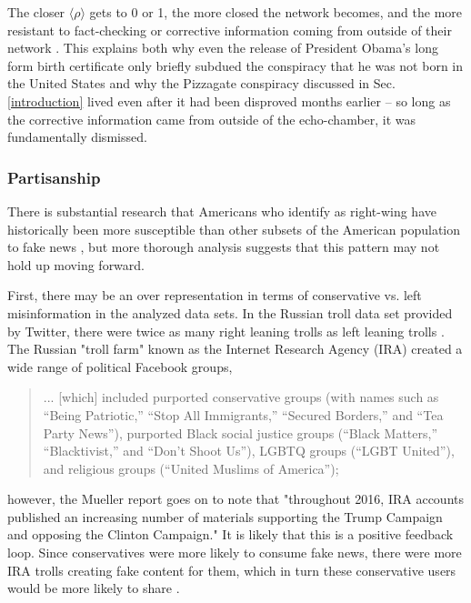 \documentclass[preprint,review,12pt]{elsarticle}
\begin{document}
The closer $\langle \rho \rangle$ gets to 0 or 1, the more closed the network becomes, and the more resistant to fact-checking or corrective information coming from outside of their network \cite{garrett2013undermining,lord1979biased,edwards1996disconfirmation,redlawsk2002hot, taber2006motivated}. This explains both why even the release of President Obama's long form birth certificate only briefly subdued the conspiracy that he was not born in the United States \cite{nyhan2012new} and why the Pizzagate conspiracy discussed in Sec. \ref{introduction} lived even after it had been disproved months earlier -- so long as the corrective information came from outside of the echo-chamber, it was fundamentally dismissed.


\subsubsection{Partisanship} 
\label{Partisanship Section}
There is substantial research that Americans who identify as right-wing have historically been more susceptible than other subsets of the American population to fake news \cite{guess2019less,benkler2018network,grinberg2019fake,allcott2017social,badawy2018analyzing}, but more thorough analysis suggests that this pattern may not hold up moving forward.

First, there may be an over representation in terms of conservative vs. left misinformation in the analyzed data sets. In the Russian troll data set provided by Twitter, there were twice as many right leaning trolls as left leaning trolls \cite{freelon2020black,badawy2018analyzing,benkler2018network}. The Russian "troll farm" known as the Internet Research Agency (IRA) created a wide range of political Facebook groups,\begin{quote}
    ... [which] included purported conservative groups (with names such as “Being Patriotic,” “Stop All Immigrants,” “Secured Borders,” and “Tea Party News”), purported Black social justice groups (“Black Matters,” “Blacktivist,” and “Don’t Shoot Us”), LGBTQ groups (“LGBT United”), and religious groups (“United Muslims of America”)\cite{mueller2019mueller};
\end{quote} however, the Mueller report goes on to note that "throughout 2016, IRA accounts published an increasing number of materials supporting the Trump Campaign and opposing the Clinton Campaign." It is likely that this is a positive feedback loop. Since conservatives were more likely to consume fake news, there were more IRA trolls creating fake content for them, which  in turn these conservative users would be more likely to share \cite{bakir2018fake,bodo2019interested,silverman2016analysis,pariser2011filter}. 
\end{document}
